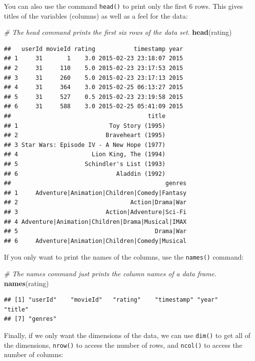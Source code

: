 \documentclass[]{book}
\newenvironment{Shaded}{\begin{snugshade}}{\end{snugshade}}
\newcommand{\KeywordTok}[1]{\textcolor[rgb]{0.13,0.29,0.53}{\textbf{{#1}}}}
\newcommand{\CommentTok}[1]{\textcolor[rgb]{0.56,0.35,0.01}{\textit{{#1}}}}
\newcommand{\NormalTok}[1]{{#1}}
\begin{document}
You can also use the command \texttt{head()} to print only the first 6
rows. This gives titles of the variables (columns) as well as a feel for
the data:

\begin{Shaded}
\begin{Highlighting}[]
\CommentTok{# The head command prints the first six rows of the data set.}
\KeywordTok{head}\NormalTok{(rating)}
\end{Highlighting}
\end{Shaded}

\begin{verbatim}
##   userId movieId rating           timestamp year
## 1     31       1    3.0 2015-02-23 23:18:07 2015
## 2     31     110    5.0 2015-02-23 23:17:53 2015
## 3     31     260    5.0 2015-02-23 23:17:13 2015
## 4     31     364    3.0 2015-02-25 06:13:27 2015
## 5     31     527    0.5 2015-02-23 23:19:58 2015
## 6     31     588    3.0 2015-02-25 05:41:09 2015
##                                       title
## 1                          Toy Story (1995)
## 2                         Braveheart (1995)
## 3 Star Wars: Episode IV - A New Hope (1977)
## 4                     Lion King, The (1994)
## 5                   Schindler's List (1993)
## 6                            Aladdin (1992)
##                                            genres
## 1     Adventure|Animation|Children|Comedy|Fantasy
## 2                                Action|Drama|War
## 3                         Action|Adventure|Sci-Fi
## 4 Adventure|Animation|Children|Drama|Musical|IMAX
## 5                                       Drama|War
## 6     Adventure|Animation|Children|Comedy|Musical
\end{verbatim}

If you only want to print the names of the columns, use the
\texttt{names()} command:

\begin{Shaded}
\begin{Highlighting}[]
\CommentTok{# The names command just prints the column names of a data frame.}
\KeywordTok{names}\NormalTok{(rating)}
\end{Highlighting}
\end{Shaded}

\begin{verbatim}
## [1] "userId"    "movieId"   "rating"    "timestamp" "year"      "title"    
## [7] "genres"
\end{verbatim}

Finally, if we only want the dimensions of the data, we can use
\texttt{dim()} to get all of the dimensions, \texttt{nrow()} to access
the number of rows, and \texttt{ncol()} to access the number of columns:
\end{document}

